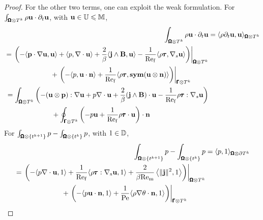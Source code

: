 \begin{proof}
        For the other two terms, one can exploit the weak formulation. For $\int_{\pmb{\mathsf{\Omega}}\otimes T^{k}}\rho\mathbf{u}\cdot\partial_{t}\mathbf{u}$, with $\mathbf{u}  \in  \mathbb{U}  \leqslant  \mathbb{M}$,
        \begin{align}
            \int_{\pmb{\mathsf{\Omega}}\otimes T^{k}}\rho\mathbf{u}\cdot\partial_{t}\mathbf{u}  &=  \langle\rho\partial_{t}\mathbf{u}, \mathbf{u}\rangle_{\pmb{\mathsf{\Omega}}\otimes T^{k}}  \\
            \begin{split}
                &=  \left.\left(- \langle\mathbf{p}\cdot\nabla\mathbf{u}, \mathbf{u}\rangle + \langle p, \nabla\cdot\mathbf{u}\rangle + \frac{2}{\beta}\langle\mathbf{j}\wedge\mathbf{B}, \mathbf{u}\rangle - \frac{1}{\mathrm{Re}_{\mathrm{f}}}\langle\rho\pmb{\mathsf{\tau}}, \nabla_{s}\mathbf{u}\rangle\right)\right|_{\pmb{\mathsf{\Omega}}\otimes T^{k}}  \\
                &\;\;\;\;\;\;\;\;\;\;\;\;\;\;\;\;\;\;\;\;\;\;\;\;  + \left.\left(- \langle p, \mathbf{u}\cdot\mathbf{n}\rangle + \frac{1}{\mathrm{Re}_{\mathrm{f}}}\langle\rho\pmb{\mathsf{\tau}}, \mathbf{sym}(\mathbf{u}\otimes\mathbf{n})\rangle\right)\right|_{\pmb{\mathsf{\Gamma}}\otimes T^{k}}
            \end{split}  \\
            \begin{split}
                &=  \int_{\pmb{\mathsf{\Omega}}\otimes T^{k}}\left(- (\mathbf{u}\otimes\mathbf{p}):\nabla\mathbf{u} + p\nabla\cdot\mathbf{u} + \frac{2}{\beta}(\mathbf{j}\wedge\mathbf{B})\cdot\mathbf{u} - \frac{1}{\mathrm{Re}_{\mathrm{f}}}\rho\pmb{\mathsf{\tau}}:\nabla_{s}\mathbf{u}\right)  \\
                &\;\;\;\;\;\;\;\;\;\;\;\;\;\;\;\;\;\;\;\;\;\;\;\;  + \oint_{\pmb{\mathsf{\Gamma}}\otimes T^{k}}\left(- p\mathbf{u} + \frac{1}{\mathrm{Re}_{\mathrm{f}}}\rho\pmb{\mathsf{\tau}}\cdot\mathbf{u}\right)\cdot\mathbf{n}
            \end{split}
        \end{align}
        For $\int_{\pmb{\mathsf{\Omega}}\otimes\left\{t^{k + 1}\right\}}p - \int_{\pmb{\mathsf{\Omega}}\otimes\left\{t^{k}\right\}}p$, with $1  \in  \mathbb{D}$,
        \begin{align}
            \int_{\bfOmega\otimes\left\{t^{k + 1}\right\}}p - \int_{\bfOmega\otimes\left\{t^{k}\right\}}p  &=  \langle p, 1\rangle_{\bfOmega\otimes\partial T^{k}}  \\
            \begin{split}
                &=  \left.\left(- \langle p\nabla\cdot\bfu, 1\rangle + \frac{1}{\rmRef}\langle\rho\bftau:\nabla_{\rms}\bfu, 1\rangle + \frac{2}{\beta\rmRem}\left\langle\|\bfj\|^{2}, 1\right\rangle\right)\right|_{\bfOmega\otimes T^{k}}  \\
                &\;\;\;\;\;\;\;\;\;\;\;\;\;\;\;\;\;\;\;\;\;\;\;\;+ \left.\left(- \langle p\bfu\cdot\bfn, 1\rangle + \frac{1}{\rmPe}\langle\rho\nabla\theta\cdot\bfn, 1\rangle\right)\right|_{\bfGamma\otimes T^{k}}

\end{split}
\end{align}
\end{proof}
